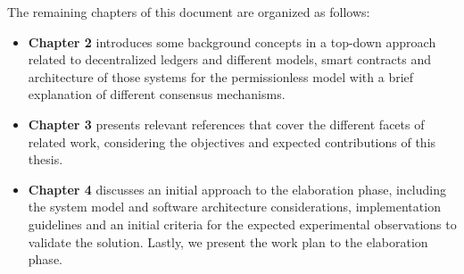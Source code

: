 The remaining chapters of this document are organized as follows:

\begin{itemize}
    \item \textbf{Chapter 2} introduces some background concepts in a top-down approach related to decentralized ledgers and different models, smart contracts and architecture of those systems for the permissionless model with a brief explanation of different consensus mechanisms.
    \item \textbf{Chapter 3} presents relevant references that cover the different facets of related work, considering the objectives and expected contributions of this thesis.
    \item \textbf{Chapter 4} discusses an initial approach to the elaboration phase, including the system model and software architecture  considerations, implementation guidelines and an initial criteria for the expected experimental observations to validate the solution. Lastly, we present the work plan to the elaboration phase.
\end{itemize}


